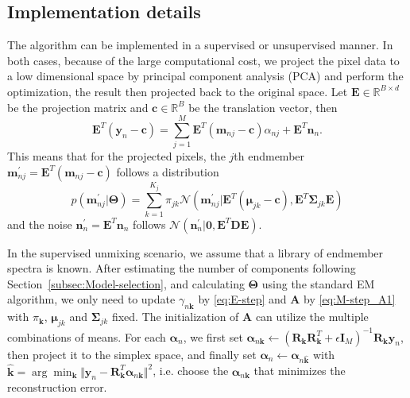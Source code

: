 \documentclass[twocolumn,english]{IEEEtran}
\theoremstyle{plain}
\begin{document}
\subsection{Implementation details}

The algorithm can be implemented in a supervised or unsupervised manner.
In both cases, because of the large computational cost, we project
the pixel data to a low dimensional space by principal component analysis
(PCA) and perform the optimization, the result then projected back
to the original space. Let $\mathbf{E}\in\mathbb{R}^{B\times d}$
be the projection matrix and $\mathbf{c}\in\mathbb{R}^{B}$ be the
translation vector, then
\[
\mathbf{E}^{T}\left(\mathbf{y}_{n}-\mathbf{c}\right)=\sum_{j=1}^{M}\mathbf{E}^{T}\left(\mathbf{m}_{nj}-\mathbf{c}\right)\alpha_{nj}+\mathbf{E}^{T}\mathbf{n}_{n}.
\]
This means that for the projected pixels, the $j$th endmember $\mathbf{m}_{nj}^{\prime}=\mathbf{E}^{T}\left(\mathbf{m}_{nj}-\mathbf{c}\right)$
follows a distribution 
\[
p\left(\mathbf{m}_{nj}^{\prime}\vert\boldsymbol{\Theta}\right)=\sum_{k=1}^{K_{j}}\pi_{jk}\mathcal{N}\left(\mathbf{m}_{nj}^{\prime}\vert\mathbf{E}^{T}\left(\boldsymbol{\mu}_{jk}-\mathbf{c}\right),\mathbf{E}^{T}\boldsymbol{\Sigma}_{jk}\mathbf{E}\right)
\]
 and the noise $\mathbf{n}_{n}^{\prime}=\mathbf{E}^{T}\mathbf{n}_{n}$
follows $\mathcal{N}\left(\mathbf{n}_{n}^{\prime}\vert\mathbf{0},\mathbf{E}^{T}\mathbf{D}\mathbf{E}\right)$.

In the supervised unmixing scenario, we assume that a library of endmember
spectra is known. After estimating the number of components following
Section~\ref{subsec:Model-selection}, and calculating $\boldsymbol{\Theta}$
using the standard EM algorithm, we only need to update $\gamma_{n\mathbf{k}}$
by \eqref{eq:E-step} and $\mathbf{A}$ by \eqref{eq:M-step_A1} with
$\pi_{\mathbf{k}}$, $\boldsymbol{\mu}_{jk}$ and $\boldsymbol{\Sigma}_{jk}$
fixed. The initialization of $\mathbf{A}$ can utilize the multiple
combinations of means. For each $\boldsymbol{\alpha}_{n}$, we first
set $\boldsymbol{\alpha}_{n\mathbf{k}}\leftarrow\left(\mathbf{R}_{\mathbf{k}}\mathbf{R}_{\mathbf{k}}^{T}+\epsilon\mathbf{I}_{M}\right)^{-1}\mathbf{R}_{\mathbf{k}}\mathbf{y}_{n}$,
then project it to the simplex space, and finally set $\boldsymbol{\alpha}_{n}\leftarrow\boldsymbol{\alpha}_{n\mathbf{\hat{k}}}$
with $\hat{\mathbf{k}}=\arg\min_{\mathbf{k}}\Vert\mathbf{y}_{n}-\mathbf{R}_{\mathbf{k}}^{T}\boldsymbol{\alpha}_{n\mathbf{k}}\Vert^{2}$,
i.e. choose the $\boldsymbol{\alpha}_{n\mathbf{k}}$ that minimizes
the reconstruction error.
\end{document}
